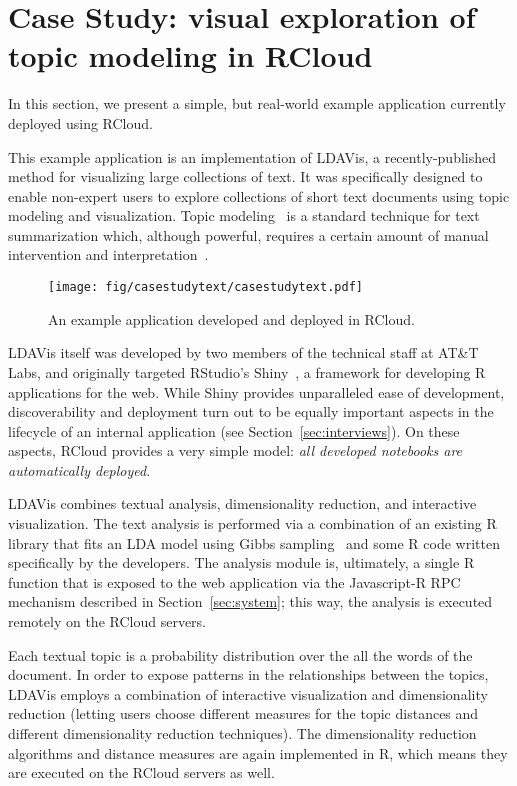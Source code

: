 \section{Case Study\label{sec:casestudy}: visual exploration of topic modeling in RCloud}

In this section, we present a simple, but real-world example
application currently deployed using RCloud.

This example application is an implementation of LDAVis, a
recently-published method for visualizing large collections of
text. It was specifically designed to enable non-expert users to
explore collections of short text documents using topic modeling and
visualization. Topic modeling~\cite{Blei:2003:LDA} is a standard
technique for text summarization which, although powerful, requires a
certain amount of manual intervention and
interpretation~\cite{Sievert:2014:LAM}.

\begin{figure*}
  \texttt{[image: fig/casestudytext/casestudytext.pdf]}
  \caption{\label{fig:textvis}An example application developed and deployed in RCloud.}
\end{figure*}

LDAVis itself was developed by two members of the technical staff at
AT\&T Labs, and originally targeted RStudio's
Shiny~\cite{RStudio:2013:SWA}, a framework for developing R
applications for the web.  While Shiny provides unparalleled ease of
development, discoverability and deployment turn out to be equally
important aspects in the lifecycle of an internal application (see
Section~\ref{sec:interviews}).  On these aspects, RCloud provides a
very simple model: \emph{all developed notebooks are automatically
  deployed}.

LDAVis combines textual analysis, dimensionality reduction, and
interactive visualization. The text analysis is performed via a
combination of an existing R library that fits an LDA model using
Gibbs sampling~\cite{} and some R code written specifically by the
developers. The analysis module is, ultimately, a single R function
that is exposed to the web application via the Javascript-R RPC
mechanism described in Section~\ref{sec:system}; this way, the
analysis is executed remotely on the RCloud servers.

Each textual topic is a probability distribution over the all the
words of the document. In order to expose patterns in the
relationships between the topics, LDAVis employs a combination of
interactive visualization and dimensionality reduction (letting users
choose different measures for the topic distances and different
dimensionality reduction techniques). The dimensionality reduction
algorithms and distance measures are again implemented in R, which
means they are executed on the RCloud servers as well.

